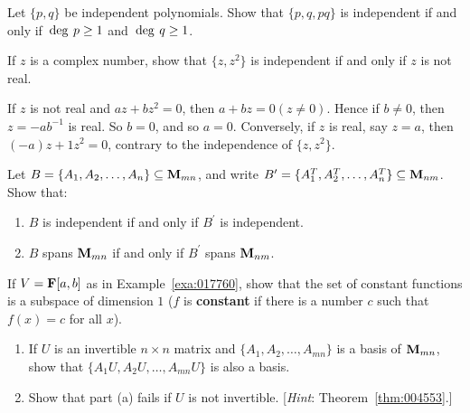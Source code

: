 \begin{multicols}{2}
\begin{ex}
Let $\{p, q\}$ be independent polynomials. Show that $\{p, q, pq\}$ is independent if and only if $\thinspace\operatorname{deg\medspace} p \geq 1$ and $\thinspace\operatorname{deg\medspace} q \geq 1$.
\end{ex}

\begin{ex}
If $z$ is a complex number, show that $\{z, z^{2}\}$ is independent if and only if $z$ is not real.

\begin{sol}
If $z$ is not real and $az + bz^{2} = 0$, then $a + bz = 0 (z \neq 0)$. Hence if $b \neq 0$, then $z = -ab^{-1}$ is real. So $b = 0$, and so $a = 0$. Conversely, if $z$ is real, say $z = a$, then $(-a)z + 1z^{2} = 0$, contrary to the independence of $\{z, z^{2}\}$.
\end{sol}
\end{ex}

\begin{ex}
Let $B = \{A_{1}, A_{2}, \dots, A_{n}\} \subseteq \textbf{M}_{mn}$, and write $B^\prime = \{A_1^T, A_2^T, \dots, A_n^T\} \subseteq \textbf{M}_{nm}$. Show that:

\begin{enumerate}[label={\alph*.}]
\item $B$ is independent if and only if $B^\prime$ is independent.

\item $B$ spans $\textbf{M}_{mn}$ if and only if $B^\prime$ spans $\textbf{M}_{nm}$.

\end{enumerate}
\end{ex}

\begin{ex}
If $V = \textbf{F}[a, b]$ as in Example~\ref{exa:017760}, show that the set of constant functions is a subspace of dimension $1$ ($f$ is \textbf{constant} if there is a number $c$ such that $f(x) = c$ for all $x$).
\end{ex}

\begin{ex}
\begin{enumerate}[label={\alph*.}]
\item If $U$ is an invertible $n \times n$ matrix and $\{A_{1}, A_{2}, \dots, A_{mn}\}$ is a basis of $\textbf{M}_{mn}$, show that $\{A_{1}U, A_{2}U, \dots, A_{mn}U\}$ is also a basis.

\item Show that part (a) fails if $U$ is not invertible. [\textit{Hint}: Theorem~\ref{thm:004553}.]


\end{enumerate}
\end{ex}
\end{multicols}
